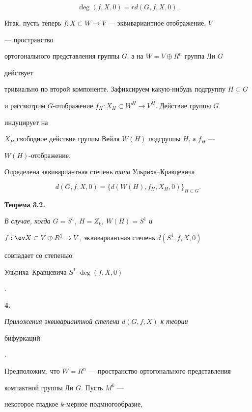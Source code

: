 $$ 


\deg(f,X,0)=rd(G,f,X,0). 


$$ 


\medskip 


 


 


Итак, пусть теперь $f:X\subset W\to V$ --- эквивариантное отображение, $V$ 


--- пространство 


ортогонального представления группы $G$, а на $W=V\oplus R^n$ группа Ли $G$ 


действует 


тривиально по второй компоненте. Зафиксируем какую-нибудь подгруппу $H\subset 


G$ 


и рассмотрим $G$-отображение $f_H:X_H\subset W^H\to V^H$. Действие группы $G$ 


индуцирует на 


$X_H$ свободное действие группы Вейля $W(H)$ подгруппы $H$, а $f_H$ --- 


$W(H)$-отображение. 


Определена эквивариантная степень {\it типа} Ульриха--Кравцевича 


$$ 


d(G,f,X,0)=\{d(W(H),f_H,X_H,0)\}_{H\subset G}. 


$$ 


\medskip 


 


 


{\bf Теорема 3.2.} {\it В случае, когда $G=S^1$, $H=Z_k$, $W(H)=S^1$ и 


$f:\ov X\subset V\oplus R^1\to V$, эквивариантная степень $d(S^1,f,X,0)$ 


совпадает со степенью 


Ульриха--Кравцевича $S^1$-$\deg(f,X,0)$}. 


\medskip 


 


{\bf 4.} {\it Приложения эквивариантной степени $d(G,f,X)$ к теории 


бифуркаций}. 


Предположим, что $W=R^n$ --- пространство ортогонального представления 


компактной группы Ли $G$. Пусть $M^k$ --- 


некоторое гладкое $k$-мерное подмногообразие, 


